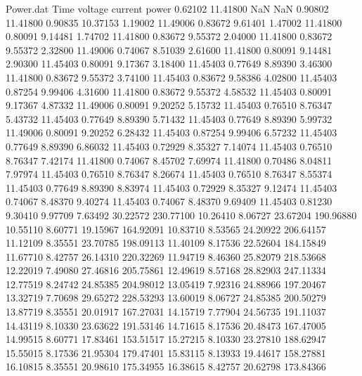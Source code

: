 \begin{filecontents}{Power.dat}
Time voltage current power
   0.62102   11.41800        NaN        NaN
   0.90802   11.41800    0.90835   10.37153
   1.19002   11.49006    0.83672    9.61401
   1.47002   11.41800    0.80091    9.14481
   1.74702   11.41800    0.83672    9.55372
   2.04000   11.41800    0.83672    9.55372
   2.32800   11.49006    0.74067    8.51039
   2.61600   11.41800    0.80091    9.14481
   2.90300   11.45403    0.80091    9.17367
   3.18400   11.45403    0.77649    8.89390
   3.46300   11.41800    0.83672    9.55372
   3.74100   11.45403    0.83672    9.58386
   4.02800   11.45403    0.87254    9.99406
   4.31600   11.41800    0.83672    9.55372
   4.58532   11.45403    0.80091    9.17367
   4.87332   11.49006    0.80091    9.20252
   5.15732   11.45403    0.76510    8.76347
   5.43732   11.45403    0.77649    8.89390
   5.71432   11.45403    0.77649    8.89390
   5.99732   11.49006    0.80091    9.20252
   6.28432   11.45403    0.87254    9.99406
   6.57232   11.45403    0.77649    8.89390
   6.86032   11.45403    0.72929    8.35327
   7.14074   11.45403    0.76510    8.76347
   7.42174   11.41800    0.74067    8.45702
   7.69974   11.41800    0.70486    8.04811
   7.97974   11.45403    0.76510    8.76347
   8.26674   11.45403    0.76510    8.76347
   8.55374   11.45403    0.77649    8.89390
   8.83974   11.45403    0.72929    8.35327
   9.12474   11.45403    0.74067    8.48370
   9.40274   11.45403    0.74067    8.48370
   9.69409   11.45403    0.81230    9.30410
   9.97709    7.63492   30.22572  230.77100
  10.26410    8.06727   23.67204  190.96880
  10.55110    8.60771   19.15967  164.92091
  10.83710    8.53565   24.20922  206.64157
  11.12109    8.35551   23.70785  198.09113
  11.40109    8.17536   22.52604  184.15849
  11.67710    8.42757   26.14310  220.32269
  11.94719    8.46360   25.82079  218.53668
  12.22019    7.49080   27.46816  205.75861
  12.49619    8.57168   28.82903  247.11334
  12.77519    8.24742   24.85385  204.98012
  13.05419    7.92316   24.88966  197.20467
  13.32719    7.70698   29.65272  228.53293
  13.60019    8.06727   24.85385  200.50279
  13.87719    8.35551   20.01917  167.27031
  14.15719    7.77904   24.56735  191.11037
  14.43119    8.10330   23.63622  191.53146
  14.71615    8.17536   20.48473  167.47005
  14.99515    8.60771   17.83461  153.51517
  15.27215    8.10330   23.27810  188.62947
  15.55015    8.17536   21.95304  179.47401
  15.83115    8.13933   19.44617  158.27881
  16.10815    8.35551   20.98610  175.34955
  16.38615    8.42757   20.62798  173.84366

\end{filecontents}
